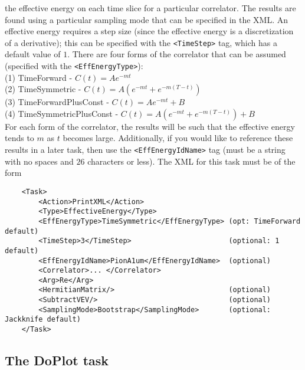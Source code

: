\documentclass[12pt]{article}
\newcommand{\vb}{\texttt}
\begin{document}
\begin{description}
the effective energy on each time slice for a
particular correlator. The results are found using a particular sampling mode
that can be specified in the XML.
An effective energy requires a step size (since the effective energy
is a discretization of a derivative); this can be specified with
the \vb{<TimeStep>} tag, which has a default value of $1$.
There are four forms of the correlator that
can be assumed (specified with the \vb{<EffEnergyType>}): \\
\hspace*{15pt} (1) TimeForward - $C(t) = A e^{-m t}$ \\
\hspace*{15pt} (2) TimeSymmetric - $C(t) = A ( e^{-m t} + e^{-m (T-t)})$ \\
\hspace*{15pt} (3) TimeForwardPlusConst - $C(t) = A e^{-m t} + B$ \\
\hspace*{15pt} (4) TimeSymmetricPlusConst - $C(t) = A ( e^{-m t} + e^{-m (T-t)}) + B$ \\
For each form of the correlator, the results will be such that
the effective energy tends to $m$ as $t$ becomes large.
Additionally, if you would like to reference these results in a later task, then
use the \vb{<EffEnergyIdName>} tag (must be a string with no spaces and $26$ characters
or less). The XML for this task must be of the form
\begin{verbatim}
    <Task>
        <Action>PrintXML</Action>
        <Type>EffectiveEnergy</Type>
        <EffEnergyType>TimeSymmetric</EffEnergyType> (opt: TimeForward default)
        <TimeStep>3</TimeStep>                       (optional: 1 default)
        <EffEnergyIdName>PionA1um</EffEnergyIdName>  (optional)
        <Correlator>... </Correlator> 
        <Arg>Re</Arg>
        <HermitianMatrix/>                           (optional)
        <SubtractVEV/>                               (optional)
        <SamplingMode>Bootstrap</SamplingMode>       (optional: Jackknife default)
    </Task>   
\end{verbatim}
\end{description}

\subsection{The DoPlot task}
\end{document}
